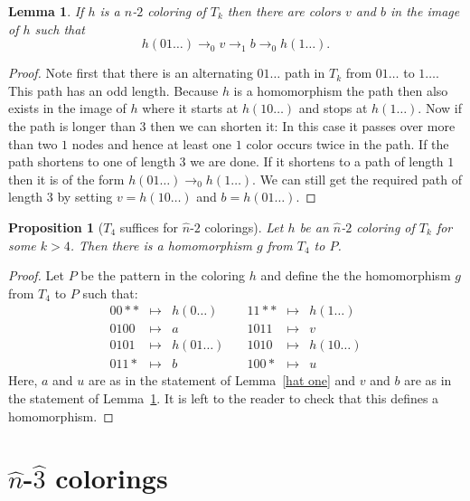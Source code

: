\documentclass[a4paper]{article}
\newcommand{\any}{{*}}
\newtheorem{lemma}[theorem]{Lemma}
\newtheorem{proposition}[theorem]{Proposition}
\begin{document}
\begin{lemma} \label{hat two}
 If $h$ is a $n$-$2$ coloring of $T_k$ then there are colors $v$
and $b$ in the image of $h$ such that
\[
 h(01\dots) \rightarrow_0 v \rightarrow_1 b \rightarrow_0 h(1\dots).
\]
\end{lemma}
\begin{proof}
 Note first that there is an alternating $01 \dots$ path in $T_k$ from
$01\dots$ to $1 \dots$. This path has an odd length. Because $h$ is a
homomorphism the path then also exists in the image of $h$ where it
starts at $h(10\dots)$ and stops at $h(1\dots)$. Now if the path is
longer than $3$ then we can shorten it: In this case it passes over more
than two $1$ nodes and hence at least one $1$ color occurs twice in the
path. If the path shortens to one of length $3$ we are done. If it
shortens to a path of length $1$ then it is of the form $h(01\dots)
\rightarrow_0 h(1\dots)$. We can still get the required path of length
$3$ by setting $v = h(10\dots)$ and $b = h(01\dots)$.
\end{proof}

\begin{proposition}[$T_4$ suffices for $\hat{n}$-$2$ colorings]
 Let $h$ be an $\hat{n}$-$2$ coloring of $T_k$ for some $k > 4$. Then
there is a homomorphism $g$ from $T_4$ to $P$.
\end{proposition}
\begin{proof}
Let $P$ be the pattern in the coloring $h$ and define the the
homomorphism $g$ from $T_4$ to $P$ such that:
\[
 \begin{array}{rcl}
 00\any\any & \mapsto & h(0\dots) \\
 0100 & \mapsto & a \\
 0101 & \mapsto & h(01\dots) \\
 011\any & \mapsto & b
 \end{array} \quad
 \begin{array}{rcl}
 11\any\any & \mapsto & h(1\dots) \\
 1011 & \mapsto & v \\
 1010 & \mapsto & h(10\dots) \\
 100\any & \mapsto & u
 \end{array}
\]
Here, $a$ and $u$ are as in the statement of Lemma~\ref{hat one} and $v$
and $b$ are as in the statement of Lemma~\ref{hat two}. It is left to
the reader to check that this defines a homomorphism.
\end{proof}


\section{$\hat{n}$-$\hat{3}$ colorings}
\end{document}
